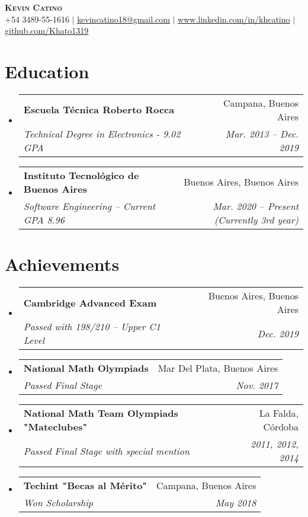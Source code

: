 \documentclass[letterpaper,11pt]{article}
\makeatletter
\newcommand{\resumeSubheading}[4]{
  \vspace{-2pt}\item
    \begin{tabular*}{0.97\textwidth}[t]{l@{\extracolsep{\fill}}r}
      \textbf{#1} & #2 \\
      \textit{\small#3} & \textit{\small #4} \\
    \end{tabular*}\vspace{-7pt}
}
\newcommand{\resumeSubHeadingListStart}{\begin{itemize}[leftmargin=0.15in, label={}]}
\newcommand{\resumeSubHeadingListEnd}{\end{itemize}}
\makeatother
\begin{document}

\begin{center}
    \textbf{\Huge \scshape Kevin Catino} \\ \vspace{1pt}
    \small +54 3489-55-1616 $|$ \href{mailto:x@x.com}{\underline{kevincatino18@gmail.com}} $|$ 
    \href{https://www.linkedin.com/in/khcatino}{\underline{www.linkedin.com/in/khcatino}} $|$
    \href{https://github.com/Khato1319}{\underline{github.com/Khato1319}}
\end{center}


\section{Education}
  \resumeSubHeadingListStart
    \resumeSubheading
      {Escuela Técnica Roberto Rocca}{Campana, Buenos Aires}
      {Technical Degree in Electronics - 9.02 GPA}{Mar. 2013 -- Dec. 2019}
    \resumeSubheading
      {Instituto Tecnológico de Buenos Aires}{Buenos Aires, Buenos Aires}
      {Software Engineering -- Current GPA 8.96}{Mar. 2020 -- Present (Currently 3rd year)}
  \resumeSubHeadingListEnd


\section{Achievements}
\resumeSubHeadingListStart
\resumeSubheading
    {Cambridge Advanced Exam}{Buenos Aires, Buenos Aires}
    {Passed with 198/210 -- Upper C1 Level}{Dec. 2019}
  \resumeSubheading
    {National Math Olympiads}{Mar Del Plata, Buenos Aires}
    {Passed Final Stage}{Nov. 2017}
    \resumeSubheading
    {National Math Team Olympiads "Mateclubes"}{La Falda, Córdoba}
    {Passed Final Stage with special mention}{2011, 2012, 2014}
  \resumeSubheading
    {Techint "Becas al Mérito"}{Campana, Buenos Aires}
    {Won Scholarship}{May 2018}
\resumeSubHeadingListEnd
\end{document}
